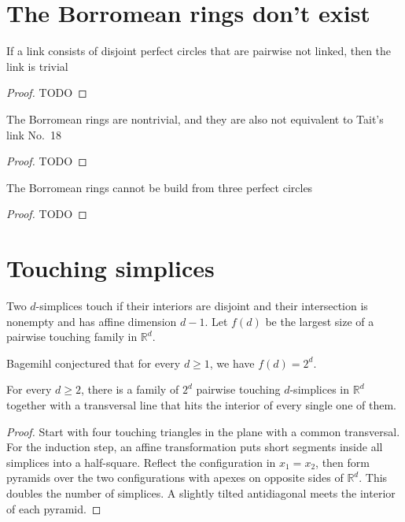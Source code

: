 \chapter{The Borromean rings don't exist}

\begin{theorem}
  \label{ch14theorem1}
  If a link consists of disjoint perfect circles that are pairwise not linked,
  then the link is trivial
\end{theorem}
\begin{proof}
  TODO
\end{proof}

\begin{theorem}
  \label{borromean_nontrivial}
  The Borromean rings are nontrivial,
  and they are also not equivalent to Tait's link No.~18
\end{theorem}
\begin{proof}
  TODO
\end{proof}

\begin{theorem}
  \label{borromean}
  The Borromean rings cannot be build from three perfect circles
\end{theorem}
\begin{proof}
  TODO
\end{proof}


\chapter{Touching simplices}

Two \(d\)-simplices touch if their interiors are disjoint and their
intersection is nonempty and has affine dimension \(d-1\).
Let \(f(d)\) be the largest size of a pairwise touching family in
\(\mathbb{R}^d\).

Bagemihl conjectured that for every \(d\ge 1\), we have \(f(d)=2^d\).

\begin{theorem}
  \label{ch16theorem1}
  \leanok
  For every \(d\ge 2\), there is a family of \(2^d\) pairwise touching
  \(d\)-simplices in \(\mathbb{R}^d\) together with a transversal line that hits the interior
  of every single one of them.
\end{theorem}
\begin{proof}
  \leanok
  Start with four touching triangles in the plane with a common transversal.
  For the induction step, an affine transformation puts short segments
  inside all simplices into a half-square. Reflect the configuration in
  \(x_1=x_2\), then form pyramids over the two configurations with apexes
  on opposite sides of \(\mathbb{R}^d\). This doubles the number of simplices.
  A slightly tilted antidiagonal meets the interior of each pyramid.
\end{proof}

